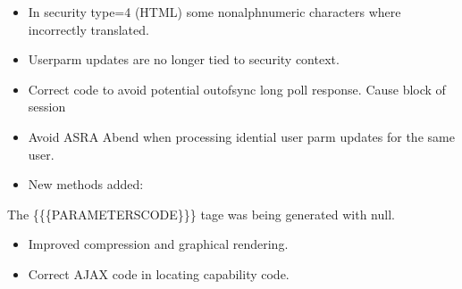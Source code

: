 \documentclass[letterpaper,10pt,english]{sphinxmanual}
\begin{document}
\begin{itemize}
\item {} 
In security type=4 (HTML) some non\sphinxhyphen{}alphnumeric characters where incorrectly translated.

\end{itemize}

\begin{itemize}
\item {} 
Userparm updates are no longer tied to security context.

\end{itemize}

\begin{itemize}
\item {} 
Correct code to avoid potential out\sphinxhyphen{}of\sphinxhyphen{}sync long poll response. Cause block of session

\end{itemize}

\begin{itemize}
\item {} 
Avoid ASRA Abend when processing idential user parm updates for the same user.

\end{itemize}

\begin{itemize}
\item {} 
New methods added:

\begin{sphinxVerbatim}[commandchars=\\\{\}]
\end{sphinxVerbatim}

\end{itemize}


The \{\{\{PARAMETERS\sphinxhyphen{}CODE\}\}\} tage was being generated with null.

\begin{itemize}
\item {} 
Improved compression and graphical rendering.

\item {} 
Correct AJAX code in locating capability code.

\end{itemize}
\end{document}
